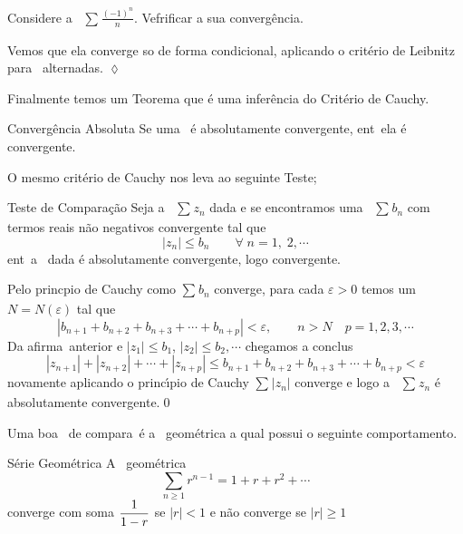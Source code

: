 \begin{exer}
Considere a \ser\ $\sum_{}\frac{(-1)^n}{n}$. Vefrificar a sua convergência. 
\end{exer}

\solo 
Vemos
que ela converge so de forma condicional, aplicando o crit\'erio
de Leibnitz para \sers\ alternadas. \hfill \(\lozenge\)

Finalmente temos um Teorema que \'{e} uma infer\^{e}ncia  do Crit\'erio de
Cauchy.

\begin{theoc}{Converg\^encia Absoluta}{}
Se uma \ser\ \'e absolutamente convergente, ent\ao\ ela \'e
convergente.
\end{theoc}

O mesmo crit\'erio de Cauchy nos leva ao seguinte Teste;
\begin{theoc}{Teste de Comparação}{}
Seja a \ser\ $\sum_{}z_{n}$ dada e se encontramos uma
\ser\  $\sum_{}b_{n}$ com termos reais n\~ao negativos convergente tal que
\begin{equation*}
  |z_{n}|\leq b_{n}\qquad \forall\; n=1,\; 2,\cdots
\end{equation*}
ent\ao\ a \ser\ dada \'e absolutamente convergente, logo
convergente.
\end{theoc}

\prova Pelo princ\ii pio de Cauchy como $\sum_{}b_{n}$ converge, para cada $\varepsilon>0$ temos um
$N=N(\varepsilon)$ tal que
\begin{equation*}
  |b_{n+1}+b_{n+2}+b_{n+3}+\cdots+b_{n+p}|<\varepsilon,\qquad
  n>N \quad p=1,2,3,\cdots
\end{equation*}
 Da afirma\cao\ anterior e $|z_{1}|\leq b_1$, $|z_{2}|\leq b_2,
 \cdots$ chegamos a conclus\ao
\begin{equation*}
 |z_{n+1}|+|z_{n+2}|+\cdots+|z_{n+p}|\leq b_{n+1}+b_{n+2}+b_{n+3}+\cdots+b_{n+p} <\varepsilon
\end{equation*}
novamente aplicando o princ\'{\i}pio de Cauchy $\sum_{}|z_{n}|$ converge e logo a \ser\ 
$\sum_{}z_{n}$ é absolutamente convergente.\qed

Uma boa \ser\ de compara\cao\ \'e a \ser\ geom\'etrica a qual
possui o seguinte comportamento.

\begin{theoc}{S\'erie Geom\'etrica}{}
A \ser\ geom\'etrica
\begin{equation*}
  \sum_{n\geq 1}r^{n-1}=1+r+r^2+\cdots
\end{equation*}
converge com soma $\displaystyle{\frac{1}{1-r}}$ se $|r|<1$ e n\~{a}o converge
se $|r|\geq 1$
\end{theoc}

